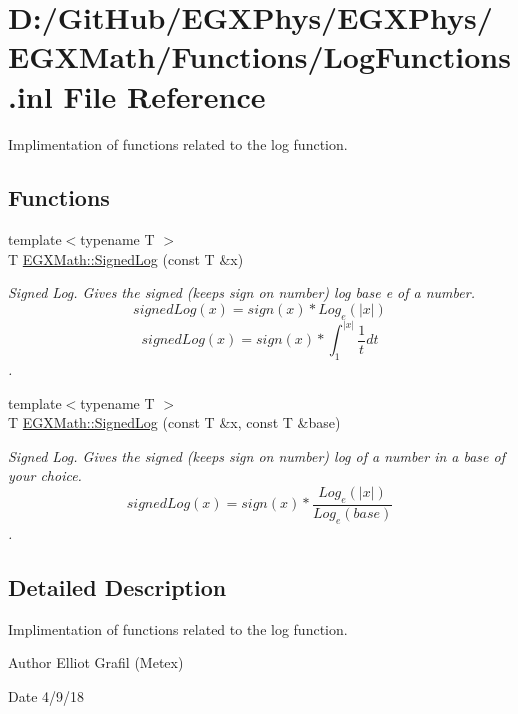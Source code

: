 \hypertarget{_log_functions_8inl}{}\section{D\+:/\+Git\+Hub/\+E\+G\+X\+Phys/\+E\+G\+X\+Phys/\+E\+G\+X\+Math/\+Functions/\+Log\+Functions.inl File Reference}
\label{_log_functions_8inl}


Implimentation of functions related to the log function.  


\subsection*{Functions}
\begin{DoxyCompactItemize}
\item 
{\footnotesize template$<$typename T $>$ }\\T \mbox{\hyperlink{group___e_g_x_math-_functions-_log_gac87b6832572195929967808d98d502d5}{E\+G\+X\+Math\+::\+Signed\+Log}} (const T \&x)
\begin{DoxyCompactList}\small\item\em Signed Log. Gives the signed (keeps sign on number) log base e of a number. \[signedLog(x)= sign(x)*Log_e(|x|)\] \[signedLog(x)= sign(x)*\int_{1}^{|x|}\frac{1}{t} dt\]. \end{DoxyCompactList}\item 
{\footnotesize template$<$typename T $>$ }\\T \mbox{\hyperlink{group___e_g_x_math-_functions-_log_ga4cd6a087fb1977d52a321bfad0dae0f6}{E\+G\+X\+Math\+::\+Signed\+Log}} (const T \&x, const T \&base)
\begin{DoxyCompactList}\small\item\em Signed Log. Gives the signed (keeps sign on number) log of a number in a base of your choice. \[signedLog(x)= sign(x)*\frac{Log_e(|x|)}{Log_e(base)}\]. \end{DoxyCompactList}\end{DoxyCompactItemize}


\subsection{Detailed Description}
Implimentation of functions related to the log function. 

\begin{DoxyAuthor}{Author}
Elliot Grafil (Metex) 
\end{DoxyAuthor}
\begin{DoxyDate}{Date}
4/9/18 
\end{DoxyDate}
